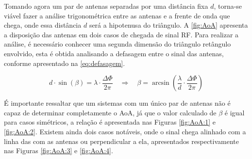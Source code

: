 Tomando agora um par de antenas separadas por uma distância fixa $d$, torna-se viável fazer a análise trigonométrica entre as antenas e a frente de onda que chega, onde essa distância $d$ será a hipotenusa do triângulo.
A \autoref{fig:AoA} apresenta a disposição das antenas em dois casos de chegada de sinal \ac{RF}.
Para realizar a análise, é necessário conhecer uma segunda dimensão do triângulo retângulo envolvido, esta é obtida analisando a defasagem entre o sinal das antenas, conforme apresentado na \autoref{eq:defasagem}.

\begin{equation}\label{eq:defasagem}
    d \cdot \sin\left(\beta\right) = \lambda \cdot \frac{\Delta\Phi}{2 \pi} \quad \Rightarrow \quad \beta = \arcsin \left(\frac{\lambda}{d} \cdot \frac{\Delta\Phi}{2 \pi}\right)
\end{equation}

É importante ressaltar que um sistemas com um único par de antenas não é capaz de determinar completamente o \ac{AoA}, já que o valor calculado de $\beta$ é igual para casos simétricos, a relação é apresentada nas Figuras \ref{fig:AoA:1} e \ref{fig:AoA:2}.
Existem ainda dois casos notáveis, onde o sinal chega alinhado com a linha das com as antenas ou perpendicular a ela, apresentados respectivamente nas Figuras \ref{fig:AoA:3} e \ref{fig:AoA:4}.

